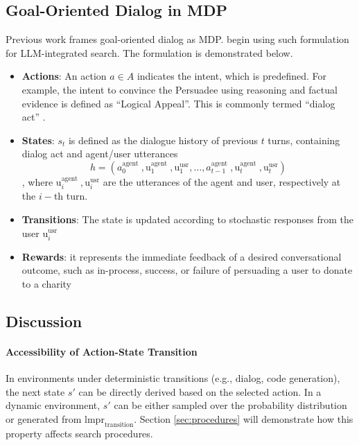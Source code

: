 \subsection{Goal-Oriented Dialog in MDP}
\label{sec:dialog}
Previous work \citep{wang-etal-2020-task} frames goal-oriented dialog as MDP.
\citet{yu2023promptbased} begin using such formulation for LLM-integrated search. The formulation is demonstrated below.
\begin{itemize}
    \item \textbf{Actions}: An action $a \in A$ indicates the intent, which is predefined. For example, the intent to convince the Persuadee using reasoning and factual evidence is defined as ``Logical Appeal''.
    This is commonly termed ``dialog act'' \citep{wang-etal-2020-task}.
    
    \item \textbf{States}: $s_t$ is defined as the dialogue history of previous $t$ turns, containing dialog act and agent/user utterances
    \begin{equation}
            h=\left(a_0^{\text {agent }}, \mathrm{u}_1^{\text {agent }}, \mathrm{u}_1^{\mathrm{usr}}, \ldots, a_{t-1}^{\text {agent }}, \mathrm{u}_t^{\text {agent }}, \mathrm{u}_t^{\mathrm{usr}}\right)
    \end{equation},
    where $\mathrm{u}_i^{\text {agent }}, \mathrm{u}_i^{\mathrm{usr}}$ are the utterances of the agent and user, respectively at the $i-$th turn.

    \item \textbf{Transitions}: The state is updated according to stochastic responses from the user $\mathrm{u}_i^{\mathrm{usr}}$ \citep{wang-etal-2020-task}

    \item \textbf{Rewards}: it represents the immediate feedback of a desired conversational outcome, such as in-process, success, or failure of persuading a user to donate to a charity 
\end{itemize}

    
\subsection{Discussion}
\paragraph{Accessibility of Action-State Transition}
In environments under deterministic transitions (e.g., dialog, code generation), the next state $s'$ can be directly derived based on the selected action. 
In a dynamic environment, $s'$ can be either sampled over the probability distribution or generated from $\text{lmpr}_{\text{transition}}$. Section \ref{sec:procedures} will demonstrate how this property affects search procedures.

